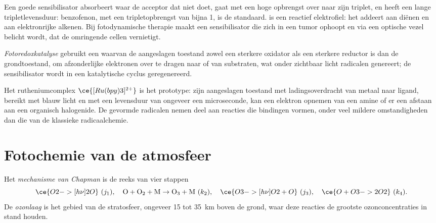 Een goede sensibilisator absorbeert waar de acceptor dat niet doet, gaat
met een hoge opbrengst over naar zijn triplet, en heeft een lange
tripletlevensduur: benzofenon, met een tripletopbrengst van bijna 1, is de
standaard.  is een reactief elektrofiel: het addeert aan
diënen en aan elektronrijke alkenen. Bij fotodynamische therapie maakt
een sensibilisator die zich in een tumor ophoopt en via een optische vezel
belicht wordt,  dat de omringende cellen vernietigt.

\begin{definition}[Fotoredoxkatalyse]\label{def:b3:photochemistry:photoredox}
\emph{Fotoredoxkatalyse} gebruikt een
 waarvan de aangeslagen toestand zowel een sterkere
oxidator als een sterkere reductor is dan de grondtoestand, om
afzonderlijke elektronen over te dragen naar of van substraten, wat onder
zichtbaar licht radicalen genereert; de sensibilisator wordt in een
katalytische cyclus geregenereerd.
\end{definition}

Het rutheniumcomplex $\ce{[Ru(bpy)3]^{2+}}$ is het prototype: zijn
aangeslagen toestand met ladingsoverdracht van metaal naar ligand,
bereikt met blauw licht en met een levensduur van ongeveer een
microseconde, kan een elektron opnemen van een amine of er een afstaan
aan een organisch halogenide. De gevormde radicalen nemen deel aan
reacties die bindingen vormen, onder veel mildere omstandigheden dan die
van de klassieke radicaalchemie.

\section{Fotochemie van de atmosfeer}

\begin{definition}\label{def:b3:photochemistry:chapman}
Het \emph{mechanisme van Chapman} is de reeks
van vier stappen
\[
  \ce{O2 ->[h\nu] 2 O}\ (j_1), \quad \mathrm{O + O_2 + M \to O_3 + M}\ (k_2), \quad
  \ce{O3 ->[h\nu] O2 + O}\ (j_3), \quad \ce{O + O3 -> 2 O2}\ (k_4).
\]
De \emph{ozonlaag} is het gebied van de stratosfeer,
ongeveer 15 tot \qty{35}{km} boven de grond, waar deze reacties de
grootste ozonconcentraties in stand houden.
\end{definition}

